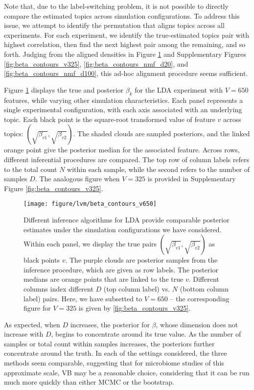 Note that, due to the label-switching problem, it is not possible to directly
compare the estimated topics across simulation configurations. To address this
issue, we attempt to identify the permutation that aligns topics across all
experiments. For each experiment, we identify the true-estimated topics pair
with highest correlation, then find the next highest pair among the remaining,
and so forth. Judging from the aligned densities in Figure
\ref{fig:beta_contours_v650} and Supplementary Figures
\ref{fig:beta_contours_v325}, \ref{fig:beta_contours_nmf_d20}, and
\ref{fig:beta_contours_nmf_d100}, this ad-hoc alignment procedure seems
sufficient.

Figure \ref{fig:beta_contours_v650} displays the true and posterior $\beta_{k}$
for the LDA experiment with $V = 650$ features, while varying other simulation
characteristics. Each panel represents a single experimental configuration, with
each axis associated with an underlying topic. Each black point is the
square-root transformed value of feature $v$ across topics:
$\left(\sqrt{\beta_{v1}}, \sqrt{\beta_{v2}}\right)$. The shaded clouds are
sampled posteriors, and the linked orange point give the posterior median for the
associated feature. Across rows, different inferential procedures are compared.
The top row of column labels refers to the total count $N$ within each sample,
while the second refers to the number of samples $D$. The analogous figure when
$V = 325$ is provided in Supplementary Figure \ref{fig:beta_contours_v325}.

\begin{figure}
  \centering\texttt{[image: figure/lvm/beta\_contours\_v650]}
  \caption{Different inference algorithms for LDA provide comparable posterior
    estimates under the simulation configurations we have considered. Within
    each panel, we display the true pairs $\left(\sqrt{\beta_{v1}},
    \sqrt{\beta_{v2}}\right)$ as black points $v$. The purple clouds are
    posterior samples from the inference procedure, which are given as row
    labels. The posterior medians are orange points that are linked to the true
    $v$. Different columns index different $D$ (top column label) vs. $N$
    (bottom column label) pairs. Here, we have subsetted to $V = 650$ -- the
    corresponding figure for $V = 325$ is given by \ref{fig:beta_contours_v325}.
  }
  \label{fig:beta_contours_v650}
\end{figure}

As expected, when $D$ increases, the posterior for $\beta$, whose dimension does
not increase with $D$, begins to concentrate around its true value. As the
number of samples or total count within samples increases, the posteriors
further concentrate around the truth. In each of the settings considered, the
three methods seem comparable, suggesting that for microbiome studies of this
approximate scale, VB may be a reasonable choice, considering that it can be run
much more quickly than either MCMC or the bootstrap.


